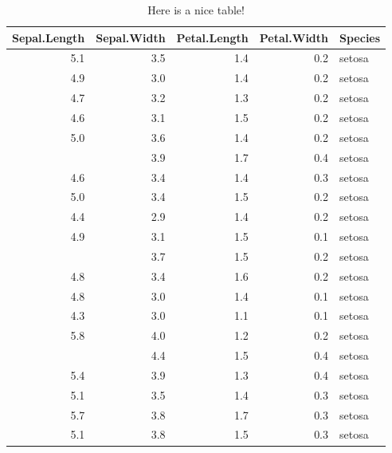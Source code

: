 \documentclass[
]{book}
\begin{document}
\begin{table}

\caption{\label{tab:nice-tab}Here is a nice table!}
\centering
\begin{tabular}[t]{rrrrl}
\toprule
Sepal.Length & Sepal.Width & Petal.Length & Petal.Width & Species\\
\midrule
5.1 & 3.5 & 1.4 & 0.2 & setosa\\
4.9 & 3.0 & 1.4 & 0.2 & setosa\\
4.7 & 3.2 & 1.3 & 0.2 & setosa\\
4.6 & 3.1 & 1.5 & 0.2 & setosa\\
5.0 & 3.6 & 1.4 & 0.2 & setosa\\
\addlinespace
5.4 & 3.9 & 1.7 & 0.4 & setosa\\
4.6 & 3.4 & 1.4 & 0.3 & setosa\\
5.0 & 3.4 & 1.5 & 0.2 & setosa\\
4.4 & 2.9 & 1.4 & 0.2 & setosa\\
4.9 & 3.1 & 1.5 & 0.1 & setosa\\
\addlinespace
5.4 & 3.7 & 1.5 & 0.2 & setosa\\
4.8 & 3.4 & 1.6 & 0.2 & setosa\\
4.8 & 3.0 & 1.4 & 0.1 & setosa\\
4.3 & 3.0 & 1.1 & 0.1 & setosa\\
5.8 & 4.0 & 1.2 & 0.2 & setosa\\
\addlinespace
5.7 & 4.4 & 1.5 & 0.4 & setosa\\
5.4 & 3.9 & 1.3 & 0.4 & setosa\\
5.1 & 3.5 & 1.4 & 0.3 & setosa\\
5.7 & 3.8 & 1.7 & 0.3 & setosa\\
5.1 & 3.8 & 1.5 & 0.3 & setosa\\
\bottomrule
\end{tabular}
\end{table}

  
\end{document}
